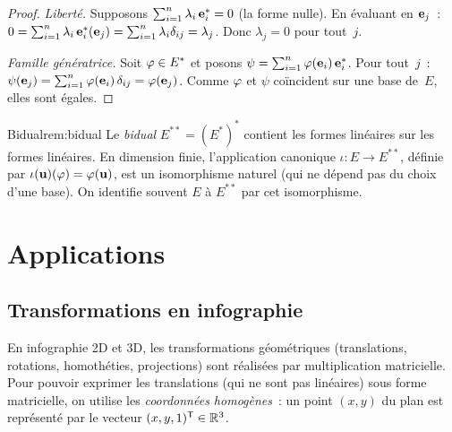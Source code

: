 \begin{proof}
  \emph{Liberté.} Supposons $\sum_{i=1}^n\lambda_i\,\mathbf{e}_{i}^*=0$ (la
  forme nulle). En évaluant en $\mathbf{e}_{j}$~:
  $0=\sum_{i=1}^n\lambda_i\,\mathbf{e}_{i}^*(\mathbf{e}_{j})
  =\sum_{i=1}^n\lambda_i\delta_{ij}=\lambda_j$. Donc $\lambda_j=0$
  pour tout~$j$.

  \emph{Famille génératrice.} Soit $\varphi\in E^*$ et posons
  $\psi=\sum_{i=1}^n\varphi(\mathbf{e}_{i})\,\mathbf{e}_{i}^*$. Pour tout~$j$~:
  $\psi(\mathbf{e}_{j})=\sum_{i=1}^n\varphi(\mathbf{e}_{i})\,\delta_{ij}
  =\varphi(\mathbf{e}_{j})$. Comme $\varphi$ et $\psi$ coïncident sur une base
  de~$E$, elles sont égales.
\end{proof}

\begin{remark}{Bidual}{rem:bidual}
  Le \emph{bidual} $E^{**}=(E^*)^*$ contient les formes
  linéaires sur les formes linéaires. En dimension finie, l'application
  canonique $\iota\colon E\to E^{**}$, définie par
  $\iota(\mathbf{u})(\varphi)=\varphi(\mathbf{u})$, est un isomorphisme naturel
  (qui ne dépend pas du choix d'une base). On identifie souvent $E$ à
  $E^{**}$ par cet isomorphisme.
\end{remark}

\section{Applications}\label{sec:applications-ch2}

\subsection{Transformations en infographie}\label{subsec:infographie}

En infographie 2D et 3D, les transformations
géométriques (translations, rotations, homothéties, projections) sont
réalisées par multiplication matricielle. Pour pouvoir exprimer les
translations (qui ne sont pas linéaires) sous forme matricielle, on
utilise les \emph{coordonnées homogènes}~:
un point $(x,y)$ du plan est représenté par le vecteur
$(x,y,1)^{\mathsf{T}}\in{\mathbb{R}}^3$.

